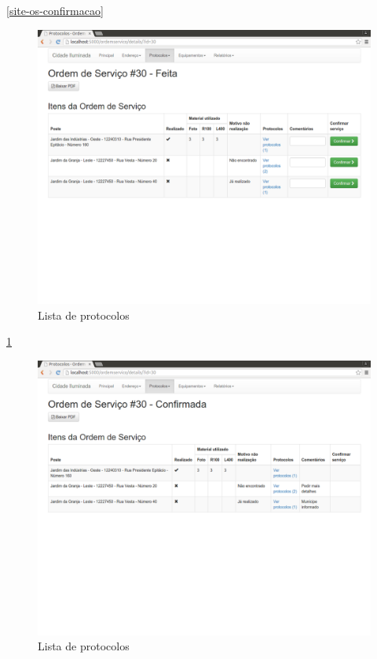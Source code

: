 \documentclass[
	article,			%
	11pt,				%
	oneside,			%
	a4paper,			%
	english,			%
	brazil,				%
	sumario=tradicional
	]{abntex2}
\begin{document}
\ref{site-os-confirmacao}

\begin{figure}[!htbp]
 \centering
 \caption{\label{site-os-confirmando}Lista de protocolos}
 \includegraphics[scale=0.25]{site/19-os_confirmando.png}
\end{figure}

\ref{site-os-confirmando}
\clearpage

\begin{figure}[!htbp]
 \centering
 \caption{\label{site-os-confirmada}Lista de protocolos}
 \includegraphics[scale=0.25]{site/20-os_confirmada.png}
\end{figure}
\end{document}

